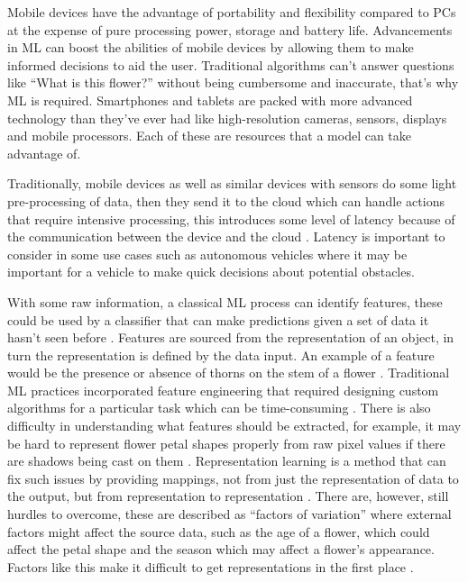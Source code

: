 \documentclass[12pt,a4paper]{report}
\begin{document}
Mobile devices have the advantage of portability and flexibility compared to PCs at the expense of pure processing 
power, storage and battery life. Advancements in ML can boost the abilities of mobile devices by allowing 
them to make informed decisions to aid the user. Traditional algorithms can't answer questions
like “What is this flower?”
without being cumbersome and inaccurate, that's why ML is required.
Smartphones and tablets are packed with more advanced technology than they've ever had like high-resolution 
cameras, sensors, displays and mobile processors. Each of these are resources that a model can take advantage of.

\par

Traditionally, mobile devices as well as similar devices with sensors do some light pre-processing of data, then they 
send it to the cloud which can handle actions that require intensive processing, this introduces some level of latency 
because of the communication between the device and the cloud \citep[p. 3]{olascoaga2021hardware}. 
Latency is important to consider in some use cases such as autonomous vehicles \citep[pp. 3-4]{olascoaga2021hardware} 
where it may be important for a vehicle to make quick decisions about potential obstacles.

\par

With some raw information, a classical ML process can identify features, these could be used by a 
classifier that can make predictions given a set of data it hasn't seen before \citep{lecun2015deep}. Features are 
sourced from the representation of an object, in turn the representation is defined by the 
data input. An example of a feature would be the presence or absence of thorns on the stem of a flower 
\citep[p. 22]{goodfellow2016deep}. Traditional ML practices incorporated 
feature engineering that required designing custom algorithms for a particular task which can be time-consuming 
\citep{liu2020representation}. There is also difficulty in understanding what features should be extracted, 
for example, it may be hard to represent flower petal shapes properly from raw pixel values if there are shadows being 
cast on them \citep[p. 23]{goodfellow2016deep}. Representation learning is a method that 
can fix such issues by providing mappings, not from just the representation of data to the output, but from 
representation to representation \citep[p. 24]{goodfellow2016deep}. There are, however, 
still hurdles to overcome, these are described as “factors of variation” where external factors might affect the source 
data, such as the age of a flower, which could affect the petal shape and the season which may affect a flower's 
appearance. Factors like this make it difficult to get representations in the first place 
\citep[p. 24]{goodfellow2016deep}.
\end{document}
